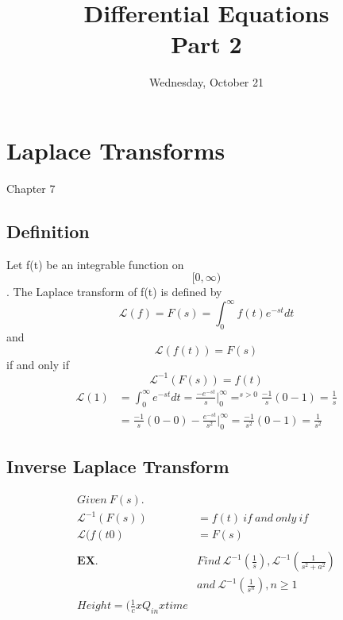 \documentclass[10pt,a4paper]{article}
\begin{document}
\title{Differential Equations\\Part 2}
\date{}
\maketitle
\pagebreak
\date{Wednesday, October 21}
\section*{Laplace Transforms}
Chapter 7
\subsection*{Definition}
Let f(t) be an integrable function on\begin{equation} [0,\infty)\end{equation}. The Laplace transform of f(t) is defined by
\begin{equation}
\mathcal{L}(f)=F(s)=\int_{0}^{\infty}f(t)e^{-st}dt
\end{equation}
and
\begin{equation}
\mathcal{L}(f(t))=F(s)
\end{equation}
if and only if 
\begin{equation}
\mathcal{L}^{-1}(F(s))=f(t)
\end{equation}
\begin{align}
\mathcal{L}(1)&=\int _{0} ^{\infty} e^{-st}dt=\frac{-e^{-st}}{s}|_{0}^{\infty} =^{s>0} \frac{-1}{s}(0-1)=\frac{1}{s}\\
&=\frac{-1}{s}(0-0)-\frac{e^{-st}}{s^{2}}|_{0}^{\infty}=\frac{-1}{s^{2}}(0-1)=\frac{1}{s^{2}}
\end{align}
\subsection*{Inverse Laplace Transform}
\begin{align*}
Given\ F(s).\\
\mathcal{L}^{-1}(F(s))&=f(t)\ if\ and\ only\ if\\
\mathcal{L}(f(t0)&=F(s)\\\\
\textbf{EX.}\ &Find\ \mathcal{L}^{-1}(\frac{1}{s}), \mathcal{L}^{-1}(\frac{1}{s^{2}+a^{2}})\\
&and\ \mathcal{L}^{-1}(\frac{1}{s^{n}}), n\geq1\\
Height = (\frac{1}{c}xQ_{in}xtime
\end{align*}
\end{document}
